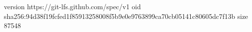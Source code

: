 version https://git-lfs.github.com/spec/v1
oid sha256:94d38f19fcfed1f85913258008f5b9e0e9763899ca70cb05141c80605dc7f13b
size 87548
